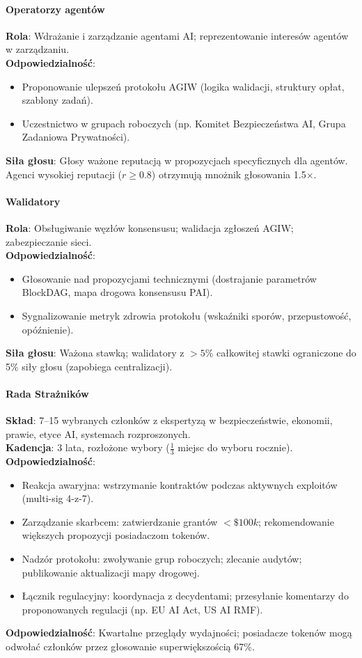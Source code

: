 \documentclass[11pt]{article}
\begin{document}
\paragraph{Operatorzy agentów}
\textbf{Rola}: Wdrażanie i zarządzanie agentami AI; reprezentowanie interesów agentów w zarządzaniu.\\
\textbf{Odpowiedzialność}:
\begin{itemize}[noitemsep]
  \item Proponowanie ulepszeń protokołu AGIW (logika walidacji, struktury opłat, szablony zadań).
  \item Uczestnictwo w grupach roboczych (np. Komitet Bezpieczeństwa AI, Grupa Zadaniowa Prywatności).
\end{itemize}
\textbf{Siła głosu}: Głosy ważone reputacją w propozycjach specyficznych dla agentów. Agenci wysokiej reputacji ($r \geq 0.8$) otrzymują mnożnik głosowania 1.5$\times$.

\paragraph{Walidatory}
\textbf{Rola}: Obsługiwanie węzłów konsensusu; walidacja zgłoszeń AGIW; zabezpieczanie sieci.\\
\textbf{Odpowiedzialność}:
\begin{itemize}[noitemsep]
  \item Głosowanie nad propozycjami technicznymi (dostrajanie parametrów BlockDAG, mapa drogowa konsensusu PAI).
  \item Sygnalizowanie metryk zdrowia protokołu (wskaźniki sporów, przepustowość, opóźnienie).
\end{itemize}
\textbf{Siła głosu}: Ważona stawką; walidatory z $>5\%$ całkowitej stawki ograniczone do 5\% siły głosu (zapobiega centralizacji).

\paragraph{Rada Strażników}
\textbf{Skład}: 7--15 wybranych członków z ekspertyzą w bezpieczeństwie, ekonomii, prawie, etyce AI, systemach rozproszonych.\\
\textbf{Kadencja}: 3 lata, rozłożone wybory ($\frac{1}{3}$ miejsc do wyboru rocznie).\\
\textbf{Odpowiedzialność}:
\begin{itemize}[noitemsep]
  \item Reakcja awaryjna: wstrzymanie kontraktów podczas aktywnych exploitów (multi-sig 4-z-7).
  \item Zarządzanie skarbcem: zatwierdzanie grantów $<\$100k$; rekomendowanie większych propozycji posiadaczom tokenów.
  \item Nadzór protokołu: zwoływanie grup roboczych; zlecanie audytów; publikowanie aktualizacji mapy drogowej.
  \item Łącznik regulacyjny: koordynacja z decydentami; przesyłanie komentarzy do proponowanych regulacji (np. EU AI Act, US AI RMF).
\end{itemize}
\textbf{Odpowiedzialność}: Kwartalne przeglądy wydajności; posiadacze tokenów mogą odwołać członków przez głosowanie superwiększością 67\%.
\end{document}
